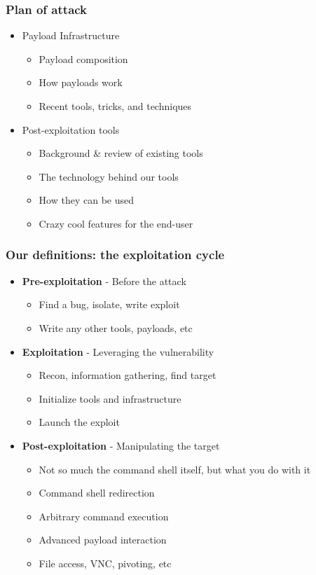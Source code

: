 \documentclass{beamer}
\newenvironment{sitemize}{\vspace{1mm}\begin{itemize}\itemsep 4pt\small}{\end{itemize}}
\begin{document}
\begin{frame}[t]
  \frametitle{Plan of attack}
  \begin{sitemize}
    \item Payload Infrastructure
    \begin{sitemize}
      \item Payload composition
      \item How payloads work
      \item Recent tools, tricks, and techniques
    \end{sitemize}
    \item Post-exploitation tools
    \begin{sitemize}
      \item Background \& review of existing tools
      \item The technology behind our tools
      \item How they can be used
      \item Crazy cool features for the end-user
    \end{sitemize}
  \end{sitemize}
\end{frame}

\begin{frame}[t]
    \frametitle{Our definitions: the exploitation cycle}

    \begin{sitemize}
        \item \textbf{Pre-exploitation} - Before the attack
        \begin{sitemize}
            \item Find a bug, isolate, write exploit
            \item Write any other tools, payloads, etc
        \end{sitemize}

        \pause
        \item \textbf{Exploitation} - Leveraging the vulnerability
        \begin{sitemize}
            \item Recon, information gathering, find target
            \item Initialize tools and infrastructure
            \item Launch the exploit
        \end{sitemize}

        \pause
        \item \textbf{Post-exploitation} - Manipulating the target
        \begin{sitemize}
            \item Not so much the command shell itself, but what you do with it
            \item Command shell redirection
            \item Arbitrary command execution
            \item Advanced payload interaction
            \item File access, VNC, pivoting, etc
        \end{sitemize}
    \end{sitemize}
\end{frame}
\end{document}
